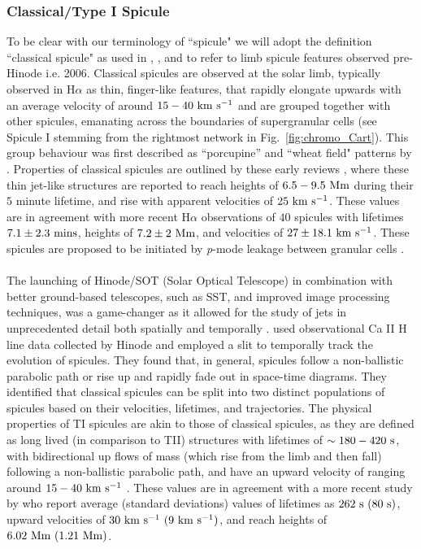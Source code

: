 \documentclass[12pt]{ociamthesis}
\newcommand{\kms}{~\rm{km ~s^{-1}}}
\newcommand{\np}{\\ \\}
\begin{document}
\subsubsection{Classical/Type I Spicule}
\label{subsec:TI}
To be clear with our terminology of ``spicule" we will adopt the definition ``classical spicule" as used in \cite{Sterling2010ApJ7221644S}, \cite{Pereira2013ApJ76469P}, and \cite{Sterling2020ApJ893L45S} to refer to limb spicule features observed pre-Hinode i.e. 2006. Classical spicules are observed at the solar limb, typically observed in H$\alpha$ as thin, finger-like features, that rapidly elongate upwards with an average velocity of around $15-40\kms$ \citep{Pontieu2007PASJ} and are grouped together with other spicules, emanating across the boundaries of supergranular cells (see Spicule I stemming from the rightmost network in Fig.~\ref{fig:chromo_Cart}). This group behaviour was first described as ``porcupine” and ``wheat field" patterns by \cite{Lippincott1957SCoA215L}. Properties of classical spicules are outlined by these early reviews \cite{Beckers1968,Beckers1972ARA&A}, where these thin jet-like structures are reported to reach heights of $6.5-9.5~\rm{Mm}$ during their $5$ minute lifetime, and rise with apparent velocities of $25\kms$. These values are in agreement with more recent H$\alpha$ observations of $40$ spicules with lifetimes $7.1\pm2.3~\rm{mins}$, heights of $7.2\pm2~\rm{Mm}$, and velocities of $27\pm18.1\kms$. These spicules are proposed to be initiated by \textit{p}-mode leakage between granular cells \citep{Pontieu2004Natur}. \np
%
The launching of Hinode/SOT (Solar Optical Telescope) in combination with better ground-based telescopes, such as SST, and improved image processing techniques, was a game-changer as it allowed for the study of jets in unprecedented detail both spatially and temporally \citep{Aschwanden2010SoPh262235A}. \cite{Pontieu2007PASJ} used observational Ca II H line data collected by Hinode and employed a slit to temporally track the evolution of spicules. They found that, in general, spicules follow a non-ballistic parabolic path or rise up and rapidly fade out in space-time diagrams. They identified that classical spicules can be split into two distinct populations of spicules based on their velocities, lifetimes, and trajectories. The physical properties of TI spicules are akin to those of classical spicules, as they are defined as long lived (in comparison to TII) structures with lifetimes of $\sim 180-420~\rm{s}$, with bidirectional up flows of mass (which rise from the limb and then fall) following a non-ballistic parabolic path, and have an upward velocity of ranging around $15-40\kms$ \citep{Pontieu2007PASJ}. These values are in agreement with a more recent study by \cite{Pereira2012} who report average (standard deviations) values of lifetimes as $262~\rm{s}~(80~\rm{s})$, upward velocities of $30\kms~(9\kms)$, and reach heights of $6.02~\rm{Mm}~(1.21~\rm{Mm})$. \np
\end{document}

